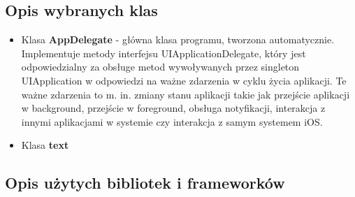 \documentclass[12pt,oneside,a4paper]{report}
\begin{document}
\subsection{Opis wybranych klas}
\begin{itemize}
	\item Klasa \textbf{AppDelegate} - główna klasa programu, tworzona automatycznie. Implementuje metody interfejsu UIApplicationDelegate, który jest odpowiedzialny za obsługe metod wywoływanych przez singleton UIApplication w odpowiedzi na ważne zdarzenia w cyklu życia aplikacji. Te ważne zdarzenia to m. in. zmiany stanu aplikacji takie jak przejście aplikacji w background, przejście w foreground, obsługa notyfikacji, interakcja z innymi aplikacjami w systemie czy interakcja z samym systemem iOS.
	\item Klasa \textbf{text}
\end{itemize}
\subsection{Opis użytych bibliotek i frameworków}
\end{document}
